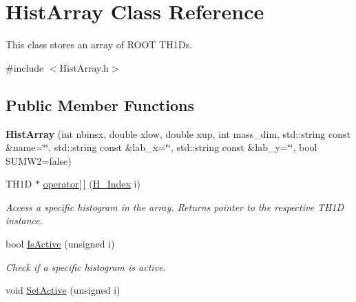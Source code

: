 \hypertarget{classHistArray}{}\section{Hist\+Array Class Reference}
\label{classHistArray}


This class stores an array of R\+O\+O\+T T\+H1\+D\textquotesingle{}s.  




{\ttfamily \#include $<$Hist\+Array.\+h$>$}

\subsection*{Public Member Functions}
\begin{DoxyCompactItemize}
\item 
\hypertarget{classHistArray_a0458829293fd8da3993d7bde7843e8f6}{}{\bfseries Hist\+Array} (int nbinsx, double xlow, double xup, int mass\+\_\+dim, std\+::string const \&name=\char`\"{}\char`\"{}, std\+::string const \&lab\+\_\+x=\char`\"{}\char`\"{}, std\+::string const \&lab\+\_\+y=\char`\"{}\char`\"{}, bool S\+U\+M\+W2=false)\label{classHistArray_a0458829293fd8da3993d7bde7843e8f6}

\item 
T\+H1\+D $\ast$ \hyperlink{classHistArray_a914db159343d33fdb5b2ccb9210792fa}{operator\mbox{[}$\,$\mbox{]}} (\hyperlink{HistArray_8h_abdf25c9f0ab78c4243f63cb2bacf26d9}{H\+\_\+\+Index} i)
\begin{DoxyCompactList}\small\item\em Access a specific histogram in the array. Returns pointer to the respective T\+H1\+D instance. \end{DoxyCompactList}\item 
\hypertarget{classHistArray_ab324fc243624240fe661ab18529f70c3}{}bool \hyperlink{classHistArray_ab324fc243624240fe661ab18529f70c3}{Is\+Active} (unsigned i)\label{classHistArray_ab324fc243624240fe661ab18529f70c3}

\begin{DoxyCompactList}\small\item\em Check if a specific histogram is active. \end{DoxyCompactList}\item 
\hypertarget{classHistArray_a5a83ba3fc0f0e30e41175d8a06bc24c3}{}void \hyperlink{classHistArray_a5a83ba3fc0f0e30e41175d8a06bc24c3}{Set\+Active} (unsigned i)\label{classHistArray_a5a83ba3fc0f0e30e41175d8a06bc24c3}


\end{DoxyCompactItemize}

